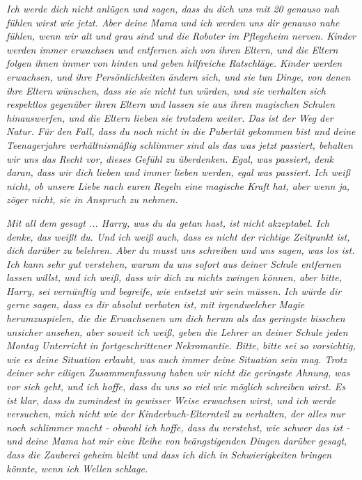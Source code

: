 \emph{Ich werde dich nicht anlügen und sagen, dass du dich uns mit 20 genauso
nah fühlen wirst wie jetzt. Aber deine Mama und ich werden uns dir genauso
nahe fühlen, wenn wir alt und grau sind und die Roboter im Pflegeheim nerven.
Kinder werden immer erwachsen und entfernen sich von ihren Eltern, und die
Eltern folgen ihnen immer von hinten und geben hilfreiche Ratschläge. Kinder
werden erwachsen, und ihre Persönlichkeiten ändern sich, und sie tun Dinge, von
denen ihre Eltern wünschen, dass sie sie nicht tun würden, und sie verhalten
sich respektlos gegenüber ihren Eltern und lassen sie aus ihren magischen
Schulen hinauswerfen, und die Eltern lieben sie trotzdem weiter. Das ist der Weg
der Natur. Für den Fall, dass du noch nicht in die Pubertät gekommen bist und
deine Teenagerjahre verhältnismäßig schlimmer sind als das was jetzt passiert,
behalten wir uns das Recht vor, dieses Gefühl zu überdenken. Egal, was passiert,
denk daran, dass wir dich lieben und immer lieben werden, egal was passiert. Ich
weiß nicht, ob unsere Liebe nach euren Regeln eine magische Kraft hat, aber wenn
ja, zöger nicht, sie in Anspruch zu nehmen.}

\emph{Mit all dem gesagt ... Harry, was du da getan hast, ist nicht akzeptabel.
Ich denke, das weißt du. Und ich weiß auch, dass es nicht der richtige Zeitpunkt
ist, dich darüber zu belehren. Aber du musst uns schreiben und uns sagen, was
los ist. Ich kann sehr gut verstehen, warum du uns sofort aus deiner Schule
entfernen lassen willst, und ich weiß, dass wir dich zu nichts zwingen können,
aber bitte, Harry, sei vernünftig und begreife, wie entsetzt wir sein müssen.
Ich würde dir gerne sagen, dass es dir absolut verboten ist, mit irgendwelcher
Magie herumzuspielen, die die Erwachsenen um dich herum als das geringste
bisschen unsicher ansehen, aber soweit ich weiß, geben die Lehrer an deiner
Schule jeden Montag Unterricht in fortgeschrittener Nekromantie. Bitte, bitte
sei so vorsichtig, wie es deine Situation erlaubt, was auch immer deine
Situation sein mag. Trotz deiner sehr eiligen Zusammenfassung haben wir nicht
die geringste Ahnung, was vor sich geht, und ich hoffe, dass du uns so viel wie
möglich schreiben wirst. Es ist klar, dass du zumindest in gewisser Weise
erwachsen wirst, und ich werde versuchen, mich nicht wie der
Kinderbuch-Elternteil zu verhalten, der alles nur noch schlimmer macht - obwohl
ich hoffe, dass du verstehst, wie schwer das ist - und deine Mama hat mir eine
Reihe von beängstigenden Dingen darüber gesagt, dass die Zauberei geheim bleibt
und dass ich dich in Schwierigkeiten bringen könnte, wenn ich Wellen schlage.}

